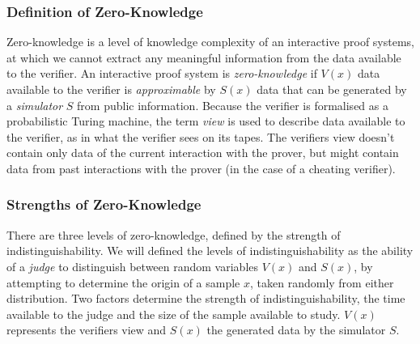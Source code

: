 %
%

\subsubsection{Definition of Zero-Knowledge}
Zero-knowledge is a level of knowledge complexity of an interactive proof systems, at which we cannot extract any meaningful information from the data available to the verifier.
\bigskip
\newline
An interactive proof system is \textit{zero-knowledge} if $V(x)$ data available to the verifier is \textit{approximable} by $S(x)$ data that can be generated by a \textit{simulator} $S$ from public information.
Because the verifier is formalised as a probabilistic Turing machine, the term \textit{view} is used to describe data available to the verifier, as in what the verifier sees on its tapes.
The verifiers view doesn't contain only data of the current interaction with the prover, but might contain data from past interactions with the prover (in the case of a cheating verifier).

\subsubsection{Strengths of Zero-Knowledge}
There are three levels of zero-knowledge, defined by the strength of indistinguishability. 
We will defined the levels of indistinguishability as the ability of a \textit{judge} to distinguish between random variables $V(x)$ and $S(x)$, by attempting to determine the origin of a sample $x$, taken randomly from either distribution.
Two factors determine the strength of indistinguishability, the time available to the judge and the size of the sample available to study.
$V(x)$ represents the verifiers view and $S(x)$ the generated data by the simulator $S$.

